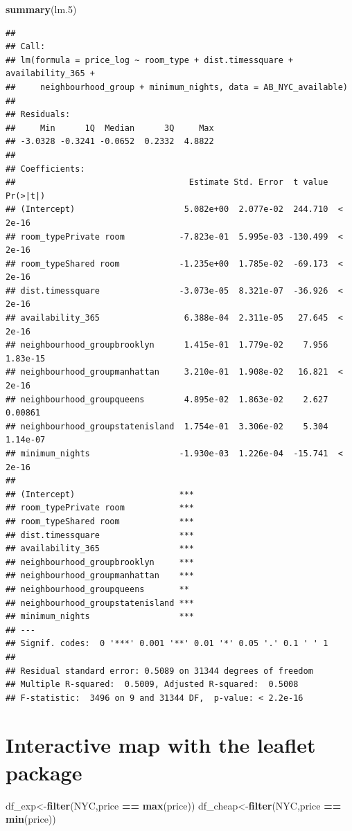 \documentclass[]{article}
\newenvironment{Shaded}{\begin{snugshade}}{\end{snugshade}}
\newcommand{\FloatTok}[1]{\textcolor[rgb]{0.00,0.00,0.81}{#1}}
\newcommand{\KeywordTok}[1]{\textcolor[rgb]{0.13,0.29,0.53}{\textbf{#1}}}
\newcommand{\NormalTok}[1]{#1}
\newcommand{\OperatorTok}[1]{\textcolor[rgb]{0.81,0.36,0.00}{\textbf{#1}}}
\newcommand{\StringTok}[1]{\textcolor[rgb]{0.31,0.60,0.02}{#1}}
\begin{document}
\begin{Shaded}
\begin{Highlighting}[]
\KeywordTok{summary}\NormalTok{(lm}\FloatTok{.5}\NormalTok{)}
\end{Highlighting}
\end{Shaded}

\begin{verbatim}
## 
## Call:
## lm(formula = price_log ~ room_type + dist.timessquare + availability_365 + 
##     neighbourhood_group + minimum_nights, data = AB_NYC_available)
## 
## Residuals:
##     Min      1Q  Median      3Q     Max 
## -3.0328 -0.3241 -0.0652  0.2332  4.8822 
## 
## Coefficients:
##                                   Estimate Std. Error  t value Pr(>|t|)
## (Intercept)                      5.082e+00  2.077e-02  244.710  < 2e-16
## room_typePrivate room           -7.823e-01  5.995e-03 -130.499  < 2e-16
## room_typeShared room            -1.235e+00  1.785e-02  -69.173  < 2e-16
## dist.timessquare                -3.073e-05  8.321e-07  -36.926  < 2e-16
## availability_365                 6.388e-04  2.311e-05   27.645  < 2e-16
## neighbourhood_groupbrooklyn      1.415e-01  1.779e-02    7.956 1.83e-15
## neighbourhood_groupmanhattan     3.210e-01  1.908e-02   16.821  < 2e-16
## neighbourhood_groupqueens        4.895e-02  1.863e-02    2.627  0.00861
## neighbourhood_groupstatenisland  1.754e-01  3.306e-02    5.304 1.14e-07
## minimum_nights                  -1.930e-03  1.226e-04  -15.741  < 2e-16
##                                    
## (Intercept)                     ***
## room_typePrivate room           ***
## room_typeShared room            ***
## dist.timessquare                ***
## availability_365                ***
## neighbourhood_groupbrooklyn     ***
## neighbourhood_groupmanhattan    ***
## neighbourhood_groupqueens       ** 
## neighbourhood_groupstatenisland ***
## minimum_nights                  ***
## ---
## Signif. codes:  0 '***' 0.001 '**' 0.01 '*' 0.05 '.' 0.1 ' ' 1
## 
## Residual standard error: 0.5089 on 31344 degrees of freedom
## Multiple R-squared:  0.5009, Adjusted R-squared:  0.5008 
## F-statistic:  3496 on 9 and 31344 DF,  p-value: < 2.2e-16
\end{verbatim}

\hypertarget{interactive-map-with-the-leaflet-package}{%
\section{Interactive map with the leaflet
package}\label{interactive-map-with-the-leaflet-package}}

\begin{Shaded}
\begin{Highlighting}[]
\NormalTok{df_exp<-}\KeywordTok{filter}\NormalTok{(NYC,price }\OperatorTok{==}\StringTok{ }\KeywordTok{max}\NormalTok{(price))}
\NormalTok{df_cheap<-}\KeywordTok{filter}\NormalTok{(NYC,price }\OperatorTok{==}\StringTok{ }\KeywordTok{min}\NormalTok{(price))}
\end{Highlighting}
\end{Shaded}
\end{document}
